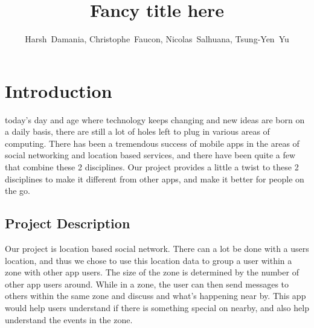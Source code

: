 \documentclass[11pt, journal]{IEEEtran}
\begin{document}
\title{Fancy title here}

\author{Harsh~Damania, Christophe~Faucon, Nicolas~Salhuana, Tsung-Yen~Yu}


\maketitle
\IEEEdisplaynotcompsoctitleabstractindextext

\section{Introduction}
	 today's day and age where technology keeps changing and new ideas are born on a daily basis, there are still a lot of holes left to plug in various areas of computing. There has been a tremendous success of mobile apps in the areas of social networking and location based services, and there have been quite a few that combine these 2 disciplines. Our project provides a little a twist to these 2 disciplines to make it different from other apps, and make it better for people on the go.

	\subsection{Project Description}
		Our project is location based social network. There can a lot be done with a users location, and thus we chose to use this location data to group a user within a zone with other app users. The size of the zone is determined by the number of other app users around. While in a zone, the user can then send messages to others within the same zone and discuss and what's happening near by. This app would help users understand if there is something special on nearby, and also help understand the events in the zone.
	
\end{document}
